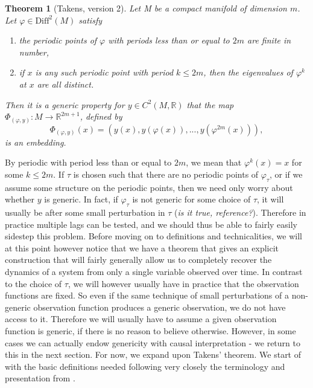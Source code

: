 \documentclass[11pt, a4paper]{memoir}
\theoremstyle{plain}
\newtheorem{thm}{Theorem}
\theoremstyle{definition}
\newcommand{\mR}{\mathbb{R}}
\begin{document}
\begin{thm}[Takens, version 2]
Let M be a compact manifold of dimension $m$. Let $\varphi\in\text{Diff}^2(M)$ satisfy
\begin{enumerate}[label=\arabic*)]
	\item the periodic points of $\varphi$ with periods less than or equal to $2m$ are finite in number,
	\item if $x$ is any such periodic point with period $k\leq 2m$, then the eigenvalues of $\varphi^k$ at $x$ are all distinct.
\end{enumerate}
 Then it is a generic property for $y\in C^2(M,\mR)$ that the map $\Phi_{(\varphi,y)}:M\to \mathbb{R}^{2m+1}$, defined by
$$\Phi_{(\varphi,y)}(x)=(y(x),y(\varphi(x)),...,y(\varphi^{2m}(x))),$$
is an embedding. \cite{Huke}
\end{thm}
By periodic with period less than or equal to $2m$, we mean that $\varphi^{k}(x)=x$ for some $k\leq 2m$. If $\tau$ is chosen such that there are no periodic points of $\varphi_\tau$, or if we assume some structure on the periodic points, then we need only worry about whether $y$ is generic. In fact, if $\varphi_\tau$ is not generic for some choice of $\tau$, it will usually be after some small perturbation in $\tau$ (\textit{is it true, reference?}). Therefore in practice multiple lags can be tested, and we should thus be able to fairly easily sidestep this problem. Before moving on to definitions and technicalities, we will at this point however notice that we have a theorem that gives an explicit construction that will fairly generally allow us to completely recover the dynamics of a system from only a single variable observed over time. In contrast to the choice of $\tau$, we will however usually have in practice that the observation functions are fixed. So even if the same technique of small perturbations of a non-generic observation function produces a generic observation, we do not have access to it. Therefore we will usually have to assume a given observation function is generic, if there is no reason to believe otherwise. However, in some cases we can actually endow genericity with causal interpretation - we return to this in the next section. For now, we expand upon Takens' theorem.  We start of with the basic definitions needed following very closely the terminology and presentation from \cite{Huke2}. 
\end{document}

